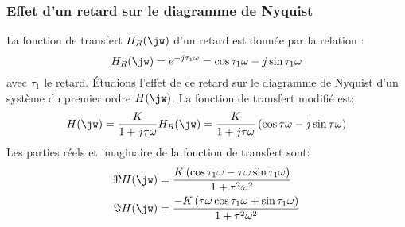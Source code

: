 \subsubsection{Effet d'un retard sur le diagramme de Nyquist}
La fonction de transfert $H_R(\jw)$ d'un retard est donnée par la relation :
$$
H_R(\jw)=e^{-j\tau_1\omega}=\cos{\tau_1\omega}-j\sin{\tau_1\omega}
$$
avec $\tau_1$ le retard. 
\'Etudions l'effet de ce retard sur le diagramme de Nyquist d'un système 
du premier ordre $H(\jw)$. La fonction de transfert modifié est:
$$
H(\jw)=\dfrac{K}{1+j\tau\omega}H_R(\jw)=
\dfrac{K}{1+j\tau\omega}\left(\cos{\tau\omega}-j\sin{\tau\omega}\right)
$$
Les parties réels et imaginaire de la fonction de transfert sont:
\begin{align*}
\Re{H(\jw)}&=
\dfrac{K\left(\cos{\tau_1\omega-\tau\omega\sin{\tau_1\omega}}\right)}
      {1+\tau^2\omega^2}\\
\Im{H(\jw)}&=
\dfrac{-K\left(\tau\omega\cos{\tau_1\omega+\sin{\tau_1\omega}}\right)}
{1+\tau^2\omega^2}\\
\end{align*}

